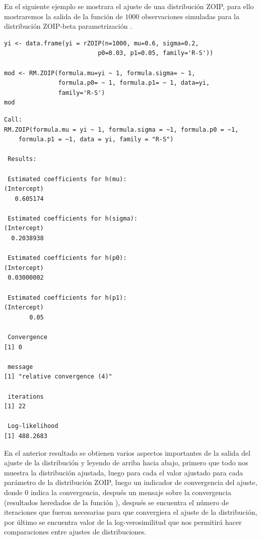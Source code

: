 En el siguiente ejemplo se mostrara el ajuste de una distribuci\'{o}n ZOIP, para ello mostraremos la salida de la funci\'{o}n  de $1000$ observaciones simuladas para la distribuci\'{o}n ZOIP-beta parametrizaci\'{o}n \cite{Stasinopoulos2}.\\

\begin{verbatim}
yi <- data.frame(yi = rZOIP(n=1000, mu=0.6, sigma=0.2,
                          p0=0.03, p1=0.05, family='R-S'))

mod <- RM.ZOIP(formula.mu=yi ~ 1, formula.sigma= ~ 1, 
               formula.p0= ~ 1, formula.p1= ~ 1, data=yi,
               family='R-S')
mod

\end{verbatim}

\begin{verbatim}
Call:
RM.ZOIP(formula.mu = yi ~ 1, formula.sigma = ~1, formula.p0 = ~1, 
    formula.p1 = ~1, data = yi, family = "R-S")

 Results: 

 Estimated coefficients for h(mu): 
(Intercept) 
   0.605174 

 Estimated coefficients for h(sigma): 
(Intercept) 
  0.2038938 

 Estimated coefficients for h(p0): 
(Intercept) 
 0.03000002 

 Estimated coefficients for h(p1): 
(Intercept) 
       0.05 

 Convergence 
[1] 0

 message 
[1] "relative convergence (4)"

 iterations 
[1] 22

 Log-likelihood 
[1] 488.2683
\end{verbatim}

En el anterior resultado se obtienen varios aspectos importantes de la salida del ajuste de la distribuci\'{o}n y leyendo de arriba hacia abajo, primero que todo nos muestra la distribuci\'{o}n ajustada, luego para cada el valor ajustado para cada par\'{a}metro de la distribuci\'{o}n ZOIP, luego un indicador de convergencia del ajuste, donde 0 indica la convergencia, despu\'{e}s un mensaje sobre la convergencia (resultados heredados de la funci\'{o}n ), despu\'{e}s se encuentra el n\'{u}mero de iteraciones que fueron necesarias para que convergiera el ajuste de la distribuci\'{o}n, por \'{u}ltimo se encuentra valor de la log-verosimilitud que nos permitir\'{a} hacer comparaciones entre ajustes de distribuciones.\\ 

